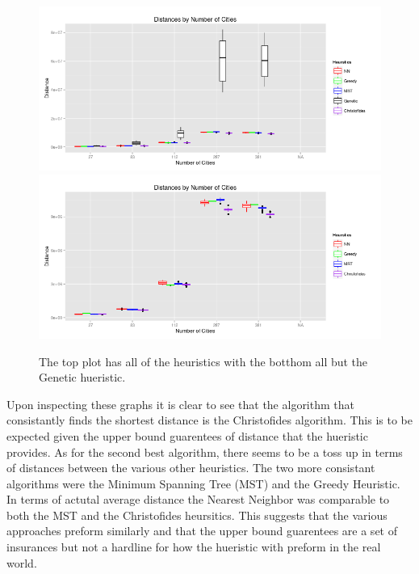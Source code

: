 \documentclass[midd]{thesis}
\newcommand{\tab}{\hspace*{2em}}
\begin{document}
\begin{figure}[t]
	\begin{center}
	\caption{The top plot has all of the heuristics with the botthom all but the Genetic hueristic.}
	\includegraphics[width=.95\textwidth]{box_w_gen}
	\includegraphics[width=.95\textwidth]{box_wo_gen}
	\end{center}
\end{figure}
\tab Upon inspecting these graphs it is clear to see that the algorithm that consistantly finds the shortest distance is the Christofides algorithm. This is to be expected given the upper bound guarentees of distance that the hueristic provides. As for the second best algorithm, there seems to be a toss up in terms of distances between the various other heuristics. The two more consistant algorithms were the Minimum Spanning Tree (MST) and the Greedy Heuristic. In terms of actutal average distance the Nearest Neighbor was comparable to both the MST and the Christofides heursitics. This suggests that the various approaches preform similarly and that the upper bound guarentees are a set of insurances but not a hardline for how the hueristic with preform in the real world. \\
\end{document}
